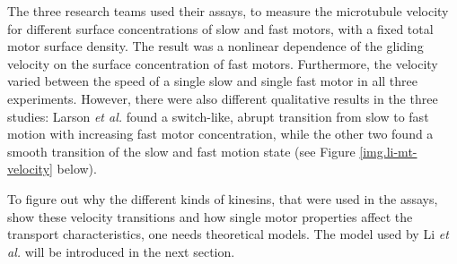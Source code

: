 
The three research teams used their assays, to measure the microtubule velocity for different surface concentrations of slow and fast motors, with a fixed total motor surface density. The result was
a nonlinear dependence of the gliding velocity on the surface concentration of fast motors. Furthermore, the velocity varied between the speed of a single slow and single fast motor in all three
experiments. However, there were also different qualitative results in the three studies: Larson \textit{et al.} \cite{larson} found a switch-like, abrupt transition from slow to fast motion with
increasing fast motor concentration, while the other two found a smooth transition of the slow and fast motion state (see Figure \ref{img.li-mt-velocity} below). 

To figure out why the different kinds of kinesins, that were used in the assays, show these velocity transitions and how single motor properties affect the transport characteristics, one needs
theoretical models. The model used by Li \textit{et al.} \cite{li} will be introduced in the next section.


